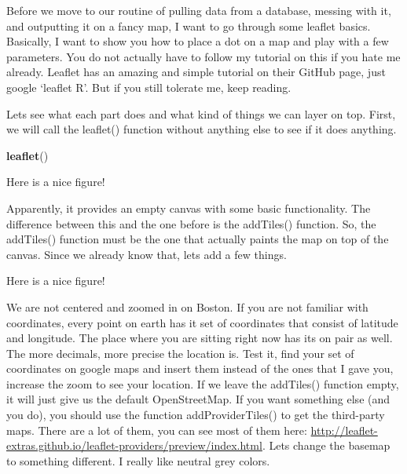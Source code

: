 \documentclass[]{book}
\newenvironment{Shaded}{\begin{snugshade}}{\end{snugshade}}
\newcommand{\CommentTok}[1]{\textcolor[rgb]{0.56,0.35,0.01}{\textit{#1}}}
\newcommand{\DataTypeTok}[1]{\textcolor[rgb]{0.13,0.29,0.53}{#1}}
\newcommand{\DecValTok}[1]{\textcolor[rgb]{0.00,0.00,0.81}{#1}}
\newcommand{\FloatTok}[1]{\textcolor[rgb]{0.00,0.00,0.81}{#1}}
\newcommand{\KeywordTok}[1]{\textcolor[rgb]{0.13,0.29,0.53}{\textbf{#1}}}
\newcommand{\NormalTok}[1]{#1}
\newcommand{\OperatorTok}[1]{\textcolor[rgb]{0.81,0.36,0.00}{\textbf{#1}}}
\newcommand{\StringTok}[1]{\textcolor[rgb]{0.31,0.60,0.02}{#1}}
\begin{document}
Before we move to our routine of pulling data from a database, messing with it, and outputting it on a fancy map, I want to go through some leaflet basics. Basically, I want to show you how to place a dot on a map and play with a few parameters. You do not actually have to follow my tutorial on this if you hate me already. Leaflet has an amazing and simple tutorial on their GitHub page, just google `leaflet R'. But if you still tolerate me, keep reading.

Lets see what each part does and what kind of things we can layer on top. First, we will call the leaflet() function without anything else to see if it does anything.

\begin{Shaded}
\begin{Highlighting}[]
\KeywordTok{leaflet}\NormalTok{() }
\end{Highlighting}
\end{Shaded}

\hypertarget{htmlwidget-b210fa06e4fef6405837}{}

\label{fig:nice-fig73}Here is a nice figure!

Apparently, it provides an empty canvas with some basic functionality. The difference between this and the one before is the addTiles() function. So, the addTiles() function must be the one that actually paints the map on top of the canvas. Since we already know that, lets add a few things.

\begin{Shaded}
\end{Shaded}

\hypertarget{htmlwidget-9e0e3c12bd8630baf03d}{}

\label{fig:nice-fig74}Here is a nice figure!

We are not centered and zoomed in on Boston. If you are not familiar with coordinates, every point on earth has it set of coordinates that consist of latitude and longitude. The place where you are sitting right now has its on pair as well. The more decimals, more precise the location is. Test it, find your set of coordinates on google maps and insert them instead of the ones that I gave you, increase the zoom to see your location. If we leave the addTiles() function empty, it will just give us the default OpenStreetMap. If you want something else (and you do), you should use the function addProviderTiles() to get the third-party maps. There are a lot of them, you can see most of them here: \url{http://leaflet-extras.github.io/leaflet-providers/preview/index.html}. Lets change the basemap to something different. I really like neutral grey colors.
\end{document}
